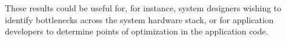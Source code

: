 \documentclass[portrait, a1]{KTHEEposter}
\begin{document}
\begin{pcolumns}[3]
\begin{pcolumn}[2]
\begin{pframe}[1.3]
                 These results could be useful for, for instance, system designers wishing to identify bottlenecks across the system hardware stack, or for application developers to determine points of optimization in the application code.
            \end{pframe}
            \begin{pframe**}
                \printbibliography
            \end{pframe**}
        \end{pcolumn}
    \end{pcolumns}
    
\end{document}

